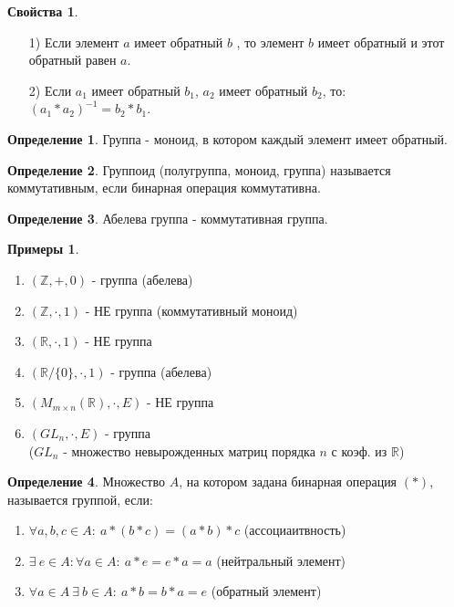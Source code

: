 \documentclass[a4paper, 12pt]{article}
\newcommand{\R}{\mathbb R}
\newcommand{\Z}{\mathbb Z}
\newcommand\tab[1][.5cm]{\hspace*{#1}}
\theoremstyle{definition}
\newtheorem*{definition}{Определение}
\newtheorem*{example}{Примеры}
\newtheorem*{properties}{Свойства}
\begin{document}
  \begin{properties}
    \begin{itemize} \tab
      \item[1)] Если элемент $a$  имеет обратный $b$ , то элемент $b$ имеет обратный и этот обратный равен $a$.
      \item[2)] Если $a_1$ имеет обратный $b_1$, $a_2$ имеет обратный $b_2$, то: $(a_1*a_2)^{-1} = b_2*b_1$.
    \end{itemize}
  \end{properties}
  \begin{definition}
    Группа - моноид, в котором каждый элемент имеет обратный.
  \end{definition}
  \begin{definition}
    Группоид (полугруппа, моноид, группа) называется коммутативным, если бинарная операция коммутативна.
  \end{definition} 
  \begin{definition}
    Абелева группа - коммутативная группа. 
  \end{definition}
  \begin{example}
    \begin{enumerate} \tab
      \item $(\Z, +, 0)$ - группа (абелева)
      \item $(\Z, \cdot, 1)$ - НЕ группа (коммутативный моноид)
      \item $(\R, \cdot, 1)$ - НЕ группа
      \item $(\R/\{0\}, \cdot, 1)$ - группа (абелева)
      \item $(M_{m \times n}(\R), \cdot, E)$ - НЕ группа
      \item $(GL_n, \cdot, E)$ - группа \\($GL_n$ - множество невырожденных матриц порядка $n$ с коэф. из $\R$)
    \end{enumerate}
  \end{example} 
  \begin{definition}
    Множество $A$, на котором задана бинарная операция $(*)$, называется группой, если:
    \begin{enumerate}
      \item  $\forall a,b,c \in A: \ a*(b*c)=(a*b)*c$ (ассоциаитвность)
      \item $\exists \ e \in A: \forall a \in A: \ a*e = e*a = a$ (нейтральный элемент)
      \item $\forall a \in A \ \exists \ b \in A: \ a*b = b*a = e $ (обратный элемент)
    \end{enumerate}
  \end{definition} 
\end{document}
